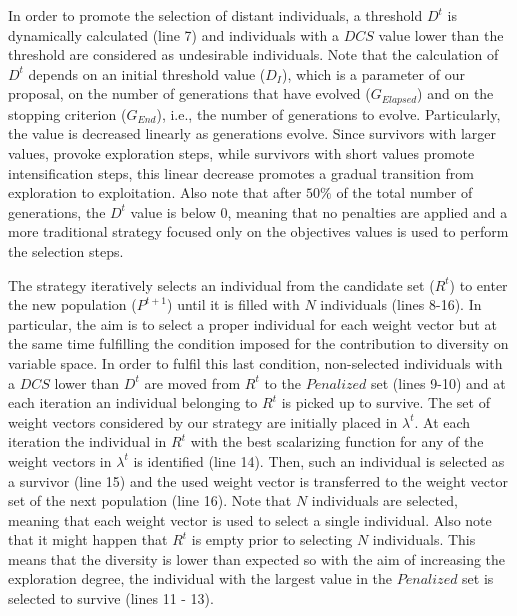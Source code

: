 In order to promote the selection of distant individuals, a threshold $D^t$ is dynamically calculated (line 7) and 
individuals with a $DCS$ value lower than the threshold are considered as undesirable individuals.
%
Note that the calculation of $D^t$ depends on an initial threshold value ($D_I$), which is a parameter of our proposal,
on the number of generations that have evolved ($G_{Elapsed}$) and on the stopping criterion ($G_{End}$), i.e., the number of
generations to evolve.
%
Particularly, the value is decreased linearly as generations evolve.
%
Since survivors with larger \DCS{} values, provoke exploration steps, while survivors with short \DCS{} values promote
intensification steps, this linear decrease promotes
a gradual transition from exploration to exploitation.
%
Also note that after $50\%$ of the total number of generations, the $D^t$ value is below 0, 
meaning that no penalties are applied and a more traditional strategy focused only on the objectives values
is used to perform the selection steps.

The strategy iteratively selects an individual from the candidate set ($R^t$) to enter the new population ($P^{t+1}$) until
it is filled with $N$ individuals (lines 8-16).
%
In particular, the aim is to select a proper individual for each weight vector but at the same time fulfilling
the condition imposed for the contribution to diversity on variable space.
%
In order to fulfil this last condition, non-selected individuals with a $DCS$
lower than $D^t$ are moved from $R^t$ to the $Penalized$ set (lines 9-10) and at each iteration
an individual belonging to $R^t$ is picked up to survive.
%
The set of weight vectors considered by our strategy are initially placed in $\lambda^{t}$.
%
At each iteration the individual in $R^t$ with the best scalarizing function for any of the weight vectors in
$\lambda^{t}$ is identified (line 14).
%
Then, such an individual is selected as a survivor (line 15) and the used weight vector is transferred to the
weight vector set of the next population (line 16).
%
Note that $N$ individuals are selected, meaning that each weight vector is used to select a single individual.
%
Also note that it might happen that $R^t$ is empty prior to selecting $N$ individuals.
%
This means that the diversity is lower than expected so
with the aim of increasing the exploration degree, the individual with the largest \DCS{} value in
the $Penalized$ set is selected to survive (lines 11 - 13).
